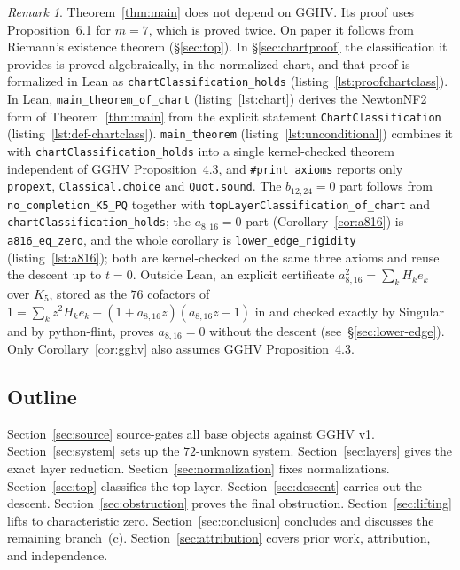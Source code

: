 \documentclass[a4paper,11pt]{article}
\newcommand{\filename}[1]{\texttt{\seqsplit{#1}}}
\theoremstyle{plain}
\theoremstyle{definition}
\theoremstyle{remark}
\newtheorem{remark}[theorem]{Remark}
\begin{document}
\begin{remark}\label{rem:conditional}
Theorem~\ref{thm:main} does not depend on GGHV. Its proof uses Proposition~6.1 for $m=7$,
which is proved twice. On paper it follows from Riemann's existence theorem
(\S\ref{sec:top}). In \S\ref{sec:chartproof} the classification it provides is proved
algebraically, in the normalized chart, and that proof is formalized in Lean as
\texttt{chartClassification\_holds} (listing~\ref{lst:proofchartclass}).
In Lean, \texttt{main\_theorem\_of\_chart} (listing~\ref{lst:chart}) derives the NewtonNF2 form of
Theorem~\ref{thm:main} from the explicit statement \texttt{ChartClassification}
(listing~\ref{lst:def-chartclass}). \texttt{main\_theorem} (listing~\ref{lst:unconditional})
combines it with \texttt{chartClassification\_holds} into a single kernel-checked
theorem independent of GGHV Proposition~4.3, and \texttt{\#print axioms} reports only \texttt{propext}, \texttt{Classical.choice}
and \texttt{Quot.sound}.
The $b_{12,24}=0$ part follows from \texttt{no\_completion\_K5\_PQ} together with \texttt{topLayerClassification\_of\_chart} and \texttt{chartClassification\_holds}; the $a_{8,16}=0$ part (Corollary~\ref{cor:a816}) is \texttt{a816\_eq\_zero}, and the whole corollary is \texttt{lower\_edge\_rigidity} (listing~\ref{lst:a816}); both are kernel-checked on the same three axioms and reuse the descent up to $t=0$. Outside Lean, an explicit certificate $a_{8,16}^2=\sum_k H_k e_k$ over $K_5$, stored as the $76$ cofactors of $1=\sum_k z^2H_k e_k-(1+a_{8,16}z)(a_{8,16}z-1)$ in \filename{scripts/a816\_certificate/a816\_lift.txt} and checked exactly by {\sc Singular} and by python-flint, proves $a_{8,16}=0$ without the descent (see~\S\ref{sec:lower-edge}). Only Corollary~\ref{cor:gghv} also assumes GGHV
Proposition~4.3.
\end{remark}

\subsection{Outline}

Section~\ref{sec:source} source-gates all base objects against GGHV v1. Section~\ref{sec:system} sets up the $72$-unknown system. Section~\ref{sec:layers} gives the exact layer reduction. Section~\ref{sec:normalization} fixes normalizations. Section~\ref{sec:top} classifies the top layer. Section~\ref{sec:descent} carries out the descent. Section~\ref{sec:obstruction} proves the final obstruction. Section~\ref{sec:lifting} lifts to characteristic zero. Section~\ref{sec:conclusion} concludes and discusses the remaining branch~(c). Section~\ref{sec:attribution} covers prior work, attribution, and independence.
\end{document}
